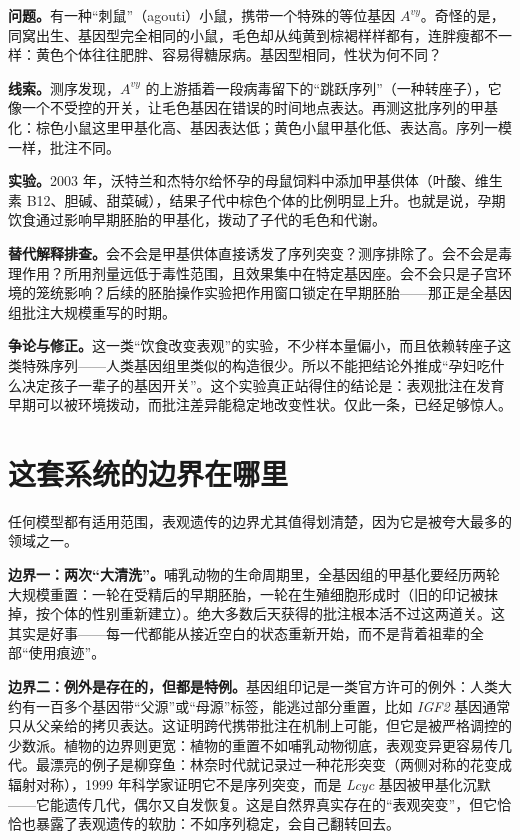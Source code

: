 \begin{zhengju}
\textbf{问题。}有一种“刺鼠”（agouti）小鼠，携带一个特殊的等位基因 $A^{vy}$。奇怪的是，同窝出生、基因型完全相同的小鼠，毛色却从纯黄到棕褐样样都有，连胖瘦都不一样：黄色个体往往肥胖、容易得糖尿病。基因型相同，性状为何不同？

\textbf{线索。}测序发现，$A^{vy}$ 的上游插着一段病毒留下的“跳跃序列”（一种转座子），它像一个不受控的开关，让毛色基因在错误的时间地点表达。再测这批序列的甲基化：棕色小鼠这里甲基化高、基因表达低；黄色小鼠甲基化低、表达高。序列一模一样，批注不同。

\textbf{实验。}2003 年，沃特兰和杰特尔给怀孕的母鼠饲料中添加甲基供体（叶酸、维生素 B12、胆碱、甜菜碱），结果子代中棕色个体的比例明显上升。也就是说，孕期饮食通过影响早期胚胎的甲基化，拨动了子代的毛色和代谢。

\textbf{替代解释排查。}会不会是甲基供体直接诱发了序列突变？测序排除了。会不会是毒理作用？所用剂量远低于毒性范围，且效果集中在特定基因座。会不会只是子宫环境的笼统影响？后续的胚胎操作实验把作用窗口锁定在早期胚胎——那正是全基因组批注大规模重写的时期。

\textbf{争论与修正。}这一类“饮食改变表观”的实验，不少样本量偏小，而且依赖转座子这类特殊序列——人类基因组里类似的构造很少。所以不能把结论外推成“孕妇吃什么决定孩子一辈子的基因开关”。这个实验真正站得住的结论是：表观批注在发育早期可以被环境拨动，而批注差异能稳定地改变性状。仅此一条，已经足够惊人。
\end{zhengju}

\section{这套系统的边界在哪里}

任何模型都有适用范围，表观遗传的边界尤其值得划清楚，因为它是被夸大最多的领域之一。

\textbf{边界一：两次“大清洗”。}哺乳动物的生命周期里，全基因组的甲基化要经历两轮大规模重置：一轮在受精后的早期胚胎，一轮在生殖细胞形成时（旧的印记被抹掉，按个体的性别重新建立）。绝大多数后天获得的批注根本活不过这两道关。这其实是好事——每一代都能从接近空白的状态重新开始，而不是背着祖辈的全部“使用痕迹”。

\textbf{边界二：例外是存在的，但都是特例。}基因组印记是一类官方许可的例外：人类大约有一百多个基因带“父源”或“母源”标签，能逃过部分重置，比如 \emph{IGF2} 基因通常只从父亲给的拷贝表达。这证明跨代携带批注在机制上可能，但它是被严格调控的少数派。植物的边界则更宽：植物的重置不如哺乳动物彻底，表观变异更容易传几代。最漂亮的例子是柳穿鱼：林奈时代就记录过一种花形突变（两侧对称的花变成辐射对称），1999 年科学家证明它不是序列突变，而是 \emph{Lcyc} 基因被甲基化沉默——它能遗传几代，偶尔又自发恢复。这是自然界真实存在的“表观突变”，但它恰恰也暴露了表观遗传的软肋：不如序列稳定，会自己翻转回去。

